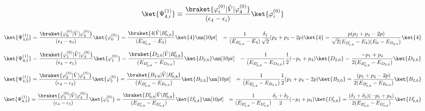 \begin{equation}
    \ket{\Psi_{4,i}^{(1)}}
    \equiv 
    \frac{\braket{\varphi_{i
     }^{(0)}|\hat{V}|\varphi_{4}^{(0)}}}{(\epsilon_{4}-\epsilon_{i})}\ket{\varphi_{i}^{(0)}}
\end{equation}




\begin{align}
    \ket{\Psi_{4,0}^{(1)}}
     &=\frac{\braket{\varphi_{0
     }^{(0)}|\hat{V}|\varphi_{4}^{(0)}}}{(\epsilon_{4}-\epsilon_{0})}\ket{\varphi_{0}^{(0)}}
     =\frac{\braket{4|\hat{V}|B_{0,8}^{\prime}}}{(E_{B_{0,8}^{\prime}}-E_4)}\ket{4}
     \nn[10pt]
     &=
     \frac{1}{(E_{B_{0,8}^{\prime}}-E_4)}
     \frac{\delta_1}{\sqrt{2}}(p_2+p_3-2p)
     \ket{4}
     =
     \frac{p(p_2+p_3-2p)}{\sqrt{2}(E_{B_{0,8}^{\prime}}-E_4)(E_0-E_{B_{2,6}})}
     \ket{4}
\end{align}
\begin{align}
     \ket{\Psi_{4,1}^{(1)}}
     &=
     \frac{\braket{\varphi_{1
     }^{(0)}|\hat{V}|\varphi_{4}^{(0)}}}{(\epsilon_{4}-\epsilon_{1})}\ket{\varphi_{1}^{(0)}}
      =\frac{\braket{D_{2,6}|\hat{V}|B_{0,8}^{\prime}}}{(E_{B_{0,8}^{\prime}}-E_{D_{2,6}})}\ket{D_{2,6}}\nn[10pt]
      &=\frac{1}{(E_{B_{0,8}^{\prime}}-E_{D_{2,6}})}
      \frac{1}{2}(-p_1+p_4)
      \ket{D_{2,6}}
      =\frac{-p_1+p_4}{2(E_{B_{0,8}^{\prime}}-E_{D_{2,6}})}
      \ket{D_{2,6}}
\end{align}
\begin{align}
     \ket{\Psi_{4,2}^{(1)}}
     &=
     \frac{\braket{\varphi_{2
     }^{(0)}|\hat{V}|\varphi_{4}^{(0)}}}{(\epsilon_{4}-\epsilon_{2})}\ket{\varphi_{2}^{(0)}}
      =\frac{\braket{B_{2,6}|\hat{V}|B_{0,8}^{\prime}}}{(E_{B_{0,8}^{\prime}}-E_{B_{2,6}})}\ket{B_{2,6}}\nn[10pt]
      &=\frac{1}{(E_{B_{0,8}^{\prime}}-E_{B_{2,6}})}
      \frac{1}{2}(p_1+p_4-2p)
      \ket{B_{2,6}}
      =\frac{(p_1+p_4-2p)}{2(E_{B_{0,8}^{\prime}}-E_{B_{2,6}})}
      \ket{B_{2,6}}
\end{align}
\begin{align}
     \ket{\Psi_{4,3}^{(1)}}
     &=
     \frac{\braket{\varphi_{3
     }^{(0)}|\hat{V}|\varphi_{4}^{(0)}}}{(\epsilon_{4}-\epsilon_{3})}\ket{\varphi_{3}^{(0)}}
      =\frac{\braket{D_{0,8}^{\prime}|\hat{V}|B_{0,8}^{\prime}}}{(E_{B_{0,8}^{\prime}}-E_{D_{0,8}^{\prime}})}\ket{D_{0,8}^{\prime}}\nn[10pt]
      &=\frac{1}{(E_{B_{0,8}^{\prime}}-E_{D_{0,8}^{\prime}})}
      \frac{\delta_1+\delta_2}{2}(-p_1+p_4)\ket{D_{0,8}^{\prime}}
      =\frac{(\delta_1+\delta_2)(-p_1+p_4)}
      {2(E_{B_{0,8}^{\prime}}-E_{D_{0,8}^{\prime}})}
      \ket{D_{0,8}^{\prime}}
\end{align}
